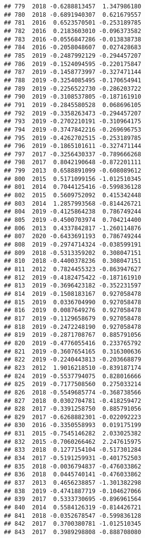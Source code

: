 \documentclass[
]{article}
\begin{document}
\begin{verbatim}
## 779  2018 -0.6288813457  1.347986180
## 780  2018 -0.6891940307  0.621679557
## 781  2016  0.6523570501 -0.253189785
## 782  2016  0.2183603010 -0.096373582
## 783  2016 -0.0556847286 -0.013838738
## 784  2016 -0.2058048607  0.027428683
## 785  2019 -0.2487992129 -0.294457207
## 786  2019 -0.1524094595 -0.220175847
## 787  2019 -0.1458773997 -0.327471144
## 788  2019 -0.3254085495 -0.170654941
## 789  2019 -0.2256522730 -0.286203722
## 790  2019 -0.3108537805 -0.187161910
## 791  2019 -0.2845580528  0.068696105
## 792  2019 -0.3358263473 -0.294457207
## 793  2019 -0.2702210191 -0.310964175
## 794  2019 -0.3747842216 -0.269696753
## 795  2019 -0.4262702515 -0.253189785
## 796  2019 -0.1865101611 -0.327471144
## 797  2017 -0.3256430337 -0.789666268
## 798  2017  0.8042190648 -0.872201111
## 799  2013  0.6588891099 -0.608089612
## 800  2015  0.5171099156 -1.012510345
## 801  2014  0.7044125416 -0.599836128
## 802  2015  0.5609752092  0.415342448
## 803  2014  1.2857993568 -0.814426721
## 804  2019 -0.4125864238  0.786749244
## 805  2019 -0.4500703974  0.704214400
## 806  2013  0.4337842817 -1.260114876
## 807  2020 -0.6433691193  0.786749244
## 808  2019 -0.2974714324 -0.038599191
## 809  2018 -0.5313359202  0.308047151
## 810  2018 -0.4400378236  0.308047151
## 811  2012  0.7824455323 -0.863947627
## 812  2019 -0.4182475422 -0.187161910
## 813  2019 -0.3696423182 -0.352231597
## 814  2019 -0.1508183167  0.927058478
## 815  2019  0.0336704990  0.927058478
## 816  2019  0.0087649276  0.927058478
## 817  2019 -0.1129658679  0.927058478
## 818  2019 -0.2472248190  0.927058478
## 819  2019 -0.2871708767  0.885791056
## 820  2019 -0.4776055416  0.233765792
## 821  2019 -0.3607654165  0.316300636
## 822  2019 -0.2240443813 -0.203668879
## 823  2012  1.9016218510 -0.839187174
## 824  2019 -0.5537794075  0.828016666
## 825  2019 -0.7177508560  0.275033214
## 826  2018 -0.5549685774 -0.368738566
## 827  2018  0.0302704781 -0.418259472
## 828  2017 -0.3391258750  0.885791056
## 829  2017 -0.6268882301 -0.022092223
## 830  2016 -0.3350558993  0.019175199
## 831  2015 -0.7545146282  2.033025382
## 832  2015 -0.7060266462  2.247615975
## 833  2018  0.1277154104 -0.517301284
## 834  2017 -0.5191259931 -0.401752503
## 835  2018 -0.0036794837 -0.476033862
## 836  2018  0.0445740141 -0.476033862
## 837  2013  0.4656238857 -1.301382298
## 838  2019 -0.4741887719 -0.104627066
## 839  2017  0.5333730695 -0.896961564
## 840  2014  0.5584126319 -0.814426721
## 841  2018 -0.0352678547 -0.599836128
## 842  2017  0.3700380781 -1.012510345
## 843  2017  0.3989298808 -0.888708080

\end{verbatim}
\end{document}
